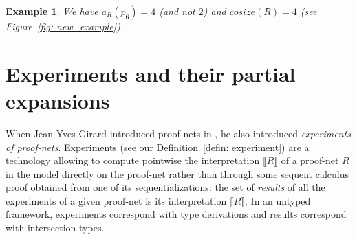 \documentclass{article}
\theoremstyle{plain}
\newtheorem{definition}{Definition}
\newtheorem{example}{Example}
\newcommand{\Nat}{\ensuremath{\mathbb{N}}}
\newcommand{\cosize}[1]{\textit{cosize}(#1)}
\newcommand{\depthof}[1]{\textit{depth}(#1)}
\newcommand{\portsatzero}[1]{\mathcal{P}_0(#1)}
\newcommand{\arity}[1]{{\textit{a}}_{#1}}
\newcommand{\boxesatzero}[1]{\mathcal{B}_{0}(#1)}
\begin{document}
\begin{example}
We have $\arity{R}(p_6) = 4$ (and not $2$) and $\cosize{R} = 4$ (see Figure~\ref{fig: new_example}).
\end{example}

\begin{comment}
\begin{definition}
Let $R$ be a differential $\circ$-PS. We define, by induction on $\depthof{R}$, $\cosize{R} \in \Nat$: $\cosize{R} = \max(\{ \arity{R}(p) ; p \in \portsatzero{R} \} \cup \{ \cosize{B_R(o)} ; o \in \boxesatzero{R} \})$.
\end{definition}

\begin{example}
We have $\cosize{R} = 4$, where $R$ is the PS of Figure~\ref{fig: new_example}.
\end{example}
\end{comment}

\section{Experiments and their partial expansions}\label{section: Experiments}




When Jean-Yves Girard introduced proof-nets in \cite{ll}, he also introduced \emph{experiments of proof-nets}. Experiments (see our Definition~\ref{defin: experiment}) are a technology allowing to compute pointwise the interpretation $\llbracket R \rrbracket$ of a proof-net $R$ in the model directly on the proof-net rather than through some sequent calculus proof obtained from one of its sequentializations: the set of \emph{results} of all the experiments of a given proof-net is its interpretation $\llbracket R \rrbracket$. In an untyped framework, experiments correspond with type derivations and results correspond with intersection types. 
\end{document}
